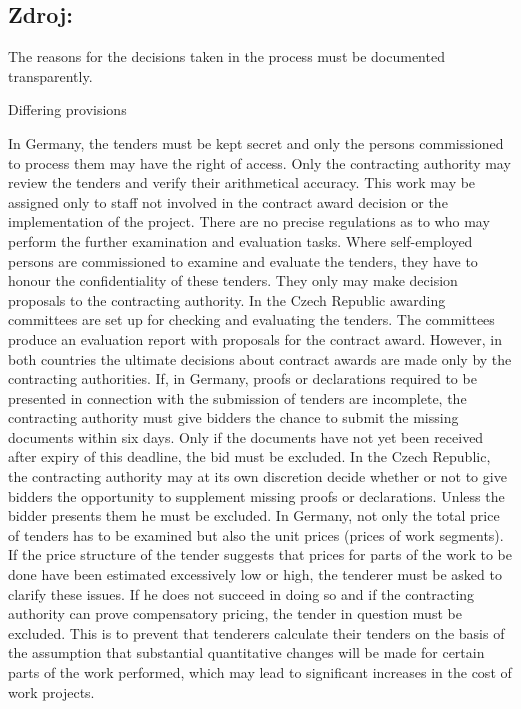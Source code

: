\documentclass[10pt]{article}
\begin{document}
\subsection*{Zdroj:}

The reasons for the decisions taken in the process must be documented transparently.


Differing provisions

In Germany, the tenders must be kept secret and only the persons commissioned to process them may have the right of access.
Only the contracting authority may review the tenders and verify their arithmetical accuracy.
This work may be assigned only to staff not involved in the contract award decision or the implementation of the project.
There are no precise regulations as to who may perform the further examination and evaluation tasks.
Where self-employed persons are commissioned to examine and evaluate the tenders, they have to honour the confidentiality of these tenders.
They only may make decision proposals to the contracting authority.
In the Czech Republic awarding committees are set up for checking and evaluating the tenders.
The committees produce an evaluation report with proposals for the contract award.
However, in both countries the ultimate decisions about contract awards are made only by the contracting authorities.
If, in Germany, proofs or declarations required to be presented in connection with the submission of tenders are incomplete, the contracting authority must give bidders the chance to submit the missing documents within six days.
Only if the documents have not yet been received after expiry of this deadline, the bid must be excluded.
In the Czech Republic, the contracting authority may at its own discretion decide whether or not to give bidders the opportunity to supplement missing proofs or declarations.
Unless the bidder presents them he must be excluded.
In Germany, not only the total price of tenders has to be examined but also the unit prices (prices of work segments).
If the price structure of the tender suggests that prices for parts of the work to be done have been estimated excessively low or high, the tenderer must be asked to clarify these issues.
If he does not succeed in doing so and if the contracting authority can prove compensatory pricing, the tender in question must be excluded.
This is to prevent that tenderers calculate their tenders on the basis of the assumption that substantial quantitative changes will be made for certain parts of the work performed, which may lead to significant increases in the cost of work projects.
\end{document}
